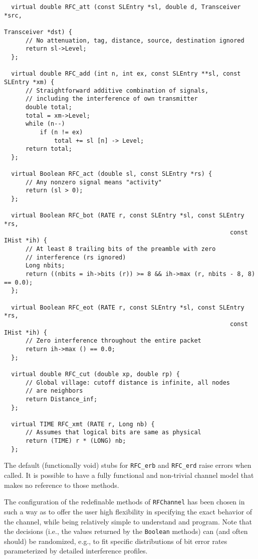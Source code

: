 {\small\begin{verbatim}
  virtual double RFC_att (const SLEntry *sl, double d, Transceiver *src,
                                                              Transceiver *dst) {
      // No attenuation, tag, distance, source, destination ignored
      return sl->Level;
  };

  virtual double RFC_add (int n, int ex, const SLEntry **sl, const SLEntry *xm) {
      // Straightforward additive combination of signals,
      // including the interference of own transmitter
      double total;
      total = xm->Level;
      while (n--)
          if (n != ex)
              total += sl [n] -> Level;
      return total;
  };

  virtual Boolean RFC_act (double sl, const SLEntry *rs) {
      // Any nonzero signal means "activity"
      return (sl > 0);
  };

  virtual Boolean RFC_bot (RATE r, const SLEntry *sl, const SLEntry *rs,
                                                               const IHist *ih) {
      // At least 8 trailing bits of the preamble with zero
      // interference (rs ignored)
      Long nbits;
      return ((nbits = ih->bits (r)) >= 8 && ih->max (r, nbits - 8, 8) == 0.0);
  };

  virtual Boolean RFC_eot (RATE r, const SLEntry *sl, const SLEntry *rs,
                                                               const IHist *ih) {
      // Zero interference throughout the entire packet
      return ih->max () == 0.0;
  };

  virtual double RFC_cut (double xp, double rp) {
      // Global village: cutoff distance is infinite, all nodes
      // are neighbors
      return Distance_inf;
  };

  virtual TIME RFC_xmt (RATE r, Long nb) {
      // Assumes that logical bits are same as physical
      return (TIME) r * (LONG) nb;
  };
\end{verbatim}}

The default (functionally void) stubs for {\tt RFC\_erb} and {\tt RFC\_erd}
raise errors when called.
It is possible to have a fully functional and non-trivial channel model that
makes no reference to those methods.

The configuration of the redefinable methods of {\tt RFChannel} has been
chosen in such a way as to offer the user high flexibility in specifying
the exact behavior of the channel, while being relatively simple to 
understand and program.
Note that the decisions (i.e., the values returned by the {\tt Boolean}
methods) can (and often should) be randomized,
e.g., to fit specific distributions of bit
error rates parameterized by detailed interference profiles.

